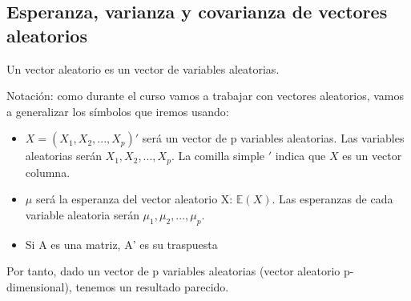 \documentclass[nochap]{apuntes}
\begin{document}
\subsection{Esperanza, varianza y covarianza de vectores aleatorios}

Un vector aleatorio es un vector de variables aleatorias.

Notación: como durante el curso vamos a trabajar con vectores aleatorios, vamos a generalizar los símbolos que iremos usando:
\begin{itemize}
\item $X = (X_1, X_2,...,X_p)'$ será un vector de p variables aleatorias. Las variables aleatorias serán $X_1, X_2,...,X_p$. La comilla simple $'$ indica que $X$ es un vector columna.
\item $\mu$ será la esperanza del vector aleatorio X: $\mathbb{E}(X)$. Las esperanzas de cada variable aleatoria serán $\mu_1, \mu_2,...,\mu_p$.
\item Si A es una matriz, A' es su traspuesta
\end{itemize}

Por tanto, dado un vector de p variables aleatorias (vector aleatorio p-dimensional), tenemos un resultado parecido.
\end{document}
